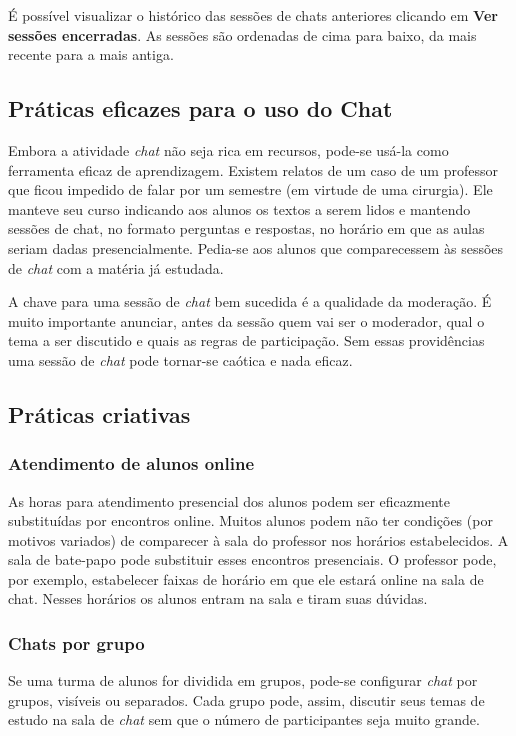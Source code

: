 É possível visualizar o histórico das sessões de chats anteriores clicando em \textbf{Ver sessões encerradas}. As sessões são ordenadas de cima para baixo, da mais recente para a mais antiga.

\subsection{Práticas eficazes para o uso do Chat}

Embora a atividade  \textit{chat} não seja rica em recursos, pode-se usá-la como ferramenta eficaz de aprendizagem.
Existem relatos de um caso de um professor que ficou impedido de falar por um semestre (em virtude de uma cirurgia). Ele manteve seu curso indicando aos alunos os textos a serem lidos e mantendo sessões de chat, no formato perguntas e respostas, no horário em que as aulas seriam dadas presencialmente. Pedia-se aos alunos que comparecessem às sessões de  \textit{chat} com a matéria já estudada.

A chave para uma sessão de  \textit{chat} bem sucedida é a qualidade da moderação. É muito importante anunciar, antes da sessão quem vai ser o moderador, qual o tema a ser discutido e quais as regras de participação. Sem essas providências uma sessão de  \textit{chat} pode tornar-se caótica e nada eficaz.

\subsection{Práticas criativas}

\subsubsection{Atendimento de alunos online}

As horas para atendimento presencial dos alunos podem ser eficazmente substituídas por encontros online. Muitos alunos podem não ter condições (por motivos variados) de comparecer à sala do professor nos horários estabelecidos. A sala de bate-papo pode substituir esses encontros presenciais. O professor pode, por exemplo, estabelecer faixas de horário em que ele estará online na sala de chat. Nesses horários os alunos entram na sala e tiram suas dúvidas.

\subsubsection{Chats por grupo}
Se uma turma de alunos for dividida em grupos, pode-se configurar  \textit{chat} por grupos, visíveis ou separados. Cada grupo pode, assim, discutir seus temas de estudo na sala de  \textit{chat} sem que o número de participantes seja muito grande.

